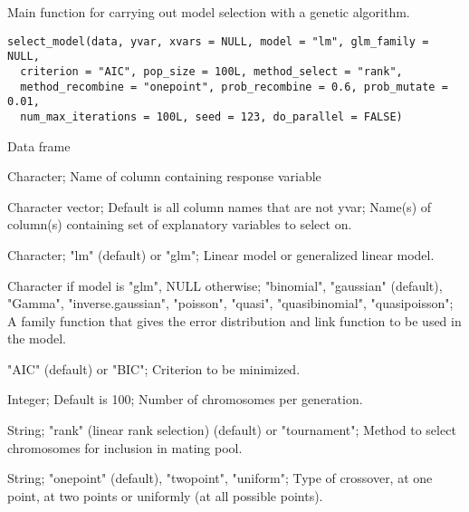 %
\begin{Description}\relax
Main function for carrying out model selection with a genetic algorithm.
\end{Description}
%
\begin{Usage}
\begin{verbatim}
select_model(data, yvar, xvars = NULL, model = "lm", glm_family = NULL,
  criterion = "AIC", pop_size = 100L, method_select = "rank",
  method_recombine = "onepoint", prob_recombine = 0.6, prob_mutate = 0.01,
  num_max_iterations = 100L, seed = 123, do_parallel = FALSE)
\end{verbatim}
\end{Usage}
%
\begin{Arguments}
\begin{ldescription}
\item[\code{data}] Data frame

\item[\code{yvar}] Character; Name of column containing response variable

\item[\code{xvars}] Character vector; Default is all column names that are not yvar;
Name(s) of column(s) containing set of explanatory variables to select on.

\item[\code{model}] Character; "lm" (default) or "glm"; Linear model or
generalized linear model.

\item[\code{glm\_family}] Character if model is "glm", NULL otherwise;
"binomial", "gaussian" (default), "Gamma", "inverse.gaussian", "poisson", "quasi",
"quasibinomial", "quasipoisson"; A family function that gives the error
distribution and link function to be used in the model.

\item[\code{criterion}] "AIC" (default) or "BIC"; Criterion to be minimized.

\item[\code{pop\_size}] Integer; Default is 100; Number of chromosomes per generation.

\item[\code{method\_select}] String; "rank" (linear rank selection) (default) or
"tournament"; Method to select chromosomes for inclusion in mating pool.

\item[\code{method\_recombine}] String; "onepoint" (default), "twopoint", "uniform";
Type of crossover, at one point, at two points or uniformly (at all possible points).


\end{ldescription}
\end{Arguments}
